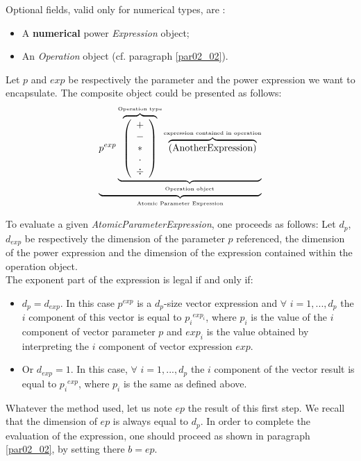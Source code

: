 \documentclass[a4paper,11pt] {ivoa}
\begin{document}
Optional fields, valid only for numerical types, are :
\begin{itemize}
\item A  {\bf numerical} power {\it Expression} object;
\item An  {\it Operation} object (cf. paragraph \ref{par02_02}).\\
\end{itemize}
Let $p$ and $exp$ be respectively the parameter and the power expression we want to encapsulate. The
composite object could be presented as follows:
\begin{equation}\label{eq01}
 \underbrace{  p^{exp} \underbrace{  \overbrace{\left( \begin{array}{c} + \\ - \\ \ast  \\ \cdot \\ \div   \end{array} \right) }^{\mbox{\tiny Operation type}}
 \overbrace{    \left( \mbox{AnotherExpression}\right) }^{\mbox{\tiny expression contained in operation}}   }_{\mbox{\tiny Operation object}}}_{\mbox{\tiny Atomic Parameter Expression}}
\end{equation}

To evaluate a given {\it AtomicParameterExpression}, one proceeds as follows: 
Let $d_p$, $d_{exp}$ be respectively the dimension of the parameter $p$ referenced, the
dimension of the power expression and the dimension of the expression contained within the operation
object.\\
The exponent part of the expression is legal if and only if:
\begin{itemize}
\item $d_p=d_{exp}$. In this case $p^{exp}$ is a $d_p$-size vector expression and $\forall$
$i=1,...,d_p$ the $i$ component of this vector is equal to ${p_i}^{exp_i}$, where $p_i$ is the value
of the $i$ component of vector parameter $p$ and $exp_i$ is the value obtained by interpreting the
$i$ component of vector expression $exp$.
\item Or $d_{exp}=1$. In this case, $\forall$ $i=1,...,d_p$ the $i$ component of the vector result
is equal to ${p_i}^{exp}$, where $p_i$ is the same as defined above.\\
\end{itemize} 

Whatever the method used, let us note $ep$ the result of this first step. We recall that the
dimension of $ep$ is always equal to $d_p$. In order to complete the evaluation of the expression,
one should proceed as shown in paragraph \ref{par02_02}, by setting there $b=ep$.
\end{document}
